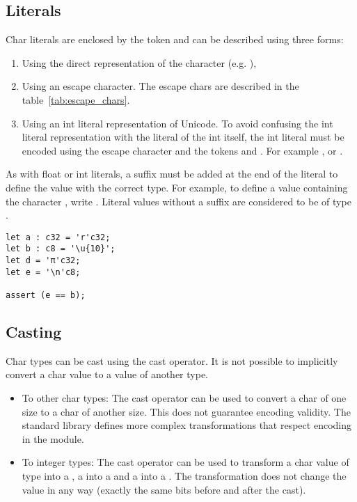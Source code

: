 \subsection{Literals}
\label{sec:org73c4919}

Char literals are enclosed by the token  and can be described using three forms:

\begin{enumerate}
\item Using the direct representation of the character (e.g. ),
\item Using an escape character. The escape chars are described in the
  table~\ref{tab:escape_chars}.

\item Using an int literal representation of Unicode. To avoid confusing the int
  literal representation with the literal of the int itself, the int literal
  must be encoded using the escape character  and the
  tokens \token{\{} and \token{\}}. For example
  ,  or
  .

\end{enumerate}

As with float or int literals, a suffix must be added at the end of the literal
to define the value with the correct type. For example, to define a 
value containing the character , write . Literal values
without a suffix are considered to be of type .

\begin{lstlisting}[style=coloredverbatim]
let a : c32 = 'r'c32;
let b : c8 = '\u{10}';
let d = 'π'c32;
let e = '\n'c8;

assert (e == b);
\end{lstlisting}

\subsection{Casting}
\label{sec:org16d703f}

Char types can be cast using the cast operator. It is not possible to implicitly convert a char value to a value of another type.

\begin{itemize}
\item To other char types: The cast operator can be used to convert a char of
  one size to a char of another size. This does not guarantee encoding validity.
  The standard library defines more complex transformations that respect
  encoding in the  module.

\item To integer types: The cast operator can be used to transform a char value
  of type  into a , a  into a  and
  a  into a . The transformation does not change the
  value in any way (exactly the same bits before and after the cast).

\end{itemize}


